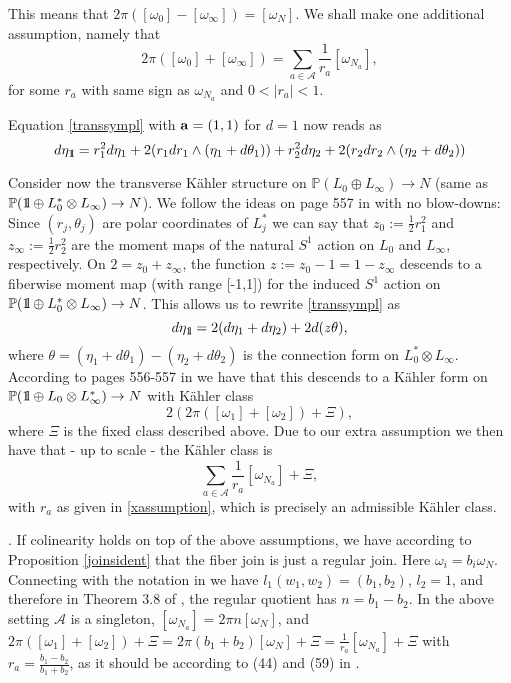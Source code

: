 \documentclass[12pt]{amsart}
\newenvironment{remark}{\medskip \refstepcounter{theorem}
\noindent  {\bf Remark \thetheorem}.\rm}{\,}
\renewcommand{\thetheorem}{\thesection.\arabic{theorem}}
\def\BOne{{\mathchoice {\rm 1\mskip-4mu l} {\rm 1\mskip-4mu l}
                          {\rm 1\mskip-4.5mu l} {\rm 1\mskip-5mu l}}}
\def\bbp{{\mathbb P}}
\def\gro{\omega}
\def\bfa{{\bf a}}
\def\cala{{\mathcal A}}
\begin{document}
This means that $2\pi([\omega_0]-[\omega_\infty])=[\gro_N]$. We shall make one additional assumption, namely that
\begin{equation}\label{xassumption}
2\pi([\omega_0]+[\omega_\infty])= \sum_{a\in\cala}\frac{1}{r_a}[\omega_{N_a}],
\end{equation}
for some $r_a$ with same sign as $\omega_{N_a}$ and
$0<|r_a|<1$.

Equation \eqref{transsympl} with $\bfa=(1,1)$ for $d=1$ now reads as
$$d\eta_\BOne= r_1^2d\eta_1 + 2(r_1dr_1\wedge (\eta_1+d\theta_1)) +r_2^2d\eta_2 + 2(r_2dr_2\wedge (\eta_2+d\theta_2))$$

Consider now the transverse K\"ahler structure on 
$\bbp(L_0\oplus L_\infty) \rightarrow N$ (same as $\bbp(\BOne \oplus L_0^*\otimes L_\infty) \rightarrow N$).
We follow the ideas on page 557 in \cite{ACGT08} with no blow-downs:
Since $(r_j,\theta_j)$ are polar coordinates of $L_j^*$ we can say that $z_0:= \frac{1}{2}r_1^2$ and $z_\infty:= \frac{1}{2}r_2^2$  are the moment maps of the natural $S^1$ action on $L_0$ and $L_\infty$, respectively. On $2=z_0+z_\infty$, the function 
$z:= z_0-1=1-z_\infty$ descends to a fiberwise moment map (with range [-1,1]) for the induced $S^1$ action on $\bbp(\BOne \oplus L_0^*\otimes L_\infty) \rightarrow N$. This allows us to rewrite  \eqref{transsympl}  as
$$d\eta_\BOne= 2 (d\eta_1+d\eta_2) + 2d(z\theta),$$
where
$\theta= (\eta_1+d\theta_1) - (\eta_2+d\theta_2)$ is the connection form on $L_0^*\otimes L_\infty$.
According to pages 556-557 in \cite{ACGT08} we have that this descends to a K\"ahler form on $\bbp(\BOne \oplus L_0\otimes L_\infty^*) \rightarrow N$ with K\"ahler class 
$$2(2\pi([\omega_1]+[\omega_2]) + \Xi),$$ 
where $\Xi$ is the fixed class described above.
Due to our extra assumption we then have that - up to scale - the K\"ahler class is
$$ \sum_{a\in\cala}\frac{1}{r_a}[\omega_{N_a}] + \Xi,$$
with $r_a$ as given in \eqref{xassumption},
which is precisely an admissible K\"ahler class.

\begin{remark}
If colinearity holds on top of the above assumptions, we have according to Proposition \ref{joinsident} that  the fiber join is just a regular join.
Here $\omega_i=b_i \omega_N$. Connecting with the notation in \cite{BoTo14a} we have $l_1(w_1,w_2)=(b_1,b_2)$, $l_2=1$, and therefore in Theorem 3.8 of \cite{BoTo14a}, the regular quotient has $n= b_1-b_2$. In the above setting $\cala$ is a singleton, $[\omega_{N_a}]=2\pi n [\omega_N]$, and 
$2\pi([\omega_1]+[\omega_2]) + \Xi = 2\pi (b_1+b_2) [\omega_N] +\Xi = \frac{1}{r_a}[\omega_{N_a}] + \Xi$
with $r_a=\frac{b_1-b_2}{b_1+b_2}$, as it should be according to (44) and (59) in \cite{BoTo14a}.
\end{remark}
\end{document}
